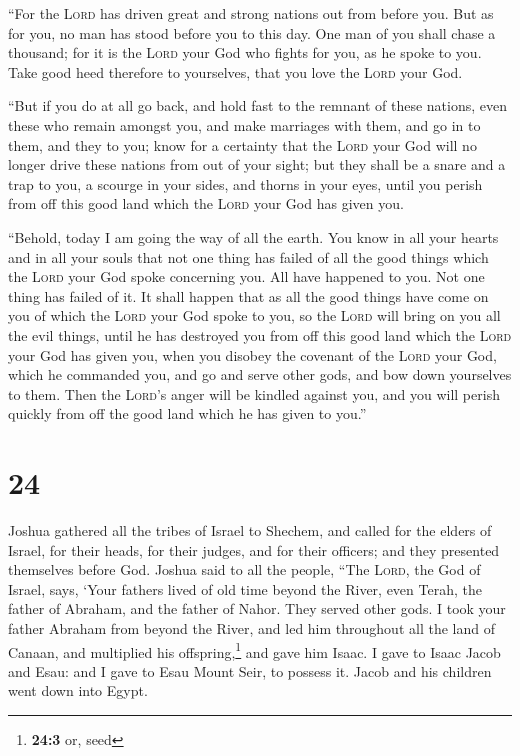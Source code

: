  ``For the \textsc{Lord} has driven great and strong
nations out from before you. But as for you, no man has stood before you
to this day.  One man of you shall chase a thousand; for
it is the \textsc{Lord} your God who fights for you, as he spoke to you.
 Take good heed therefore to yourselves, that you love
the \textsc{Lord} your God.

 ``But if you do at all go back, and hold fast to the
remnant of these nations, even these who remain amongst you, and make
marriages with them, and go in to them, and they to you; 
know for a certainty that the \textsc{Lord} your God will no longer
drive these nations from out of your sight; but they shall be a snare
and a trap to you, a scourge in your sides, and thorns in your eyes,
until you perish from off this good land which the \textsc{Lord} your
God has given you.

 ``Behold, today I am going the way of all the earth. You
know in all your hearts and in all your souls that not one thing has
failed of all the good things which the \textsc{Lord} your God spoke
concerning you. All have happened to you. Not one thing has failed of
it.  It shall happen that as all the good things have
come on you of which the \textsc{Lord} your God spoke to you, so the
\textsc{Lord} will bring on you all the evil things, until he has
destroyed you from off this good land which the \textsc{Lord} your God
has given you,  when you disobey the covenant of the
\textsc{Lord} your God, which he commanded you, and go and serve other
gods, and bow down yourselves to them. Then the \textsc{Lord}'s anger
will be kindled against you, and you will perish quickly from off the
good land which he has given to you.''

\hypertarget{section-23}{%
\section{24}\label{section-23}}

 Joshua gathered all the tribes of Israel to Shechem, and
called for the elders of Israel, for their heads, for their judges, and
for their officers; and they presented themselves before God.
 Joshua said to all the people, ``The \textsc{Lord}, the
God of Israel, says, `Your fathers lived of old time beyond the River,
even Terah, the father of Abraham, and the father of Nahor. They served
other gods.  I took your father Abraham from beyond the
River, and led him throughout all the land of Canaan, and multiplied his
offspring,\footnote{\textbf{24:3} or, seed} and gave him Isaac.
 I gave to Isaac Jacob and Esau: and I gave to Esau Mount
Seir, to possess it. Jacob and his children went down into Egypt.

